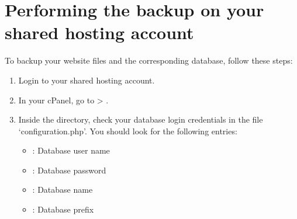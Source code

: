 \documentclass[letterpaper,10pt,english]{sphinxmanual}
\begin{document}
\section{Performing the backup on your shared hosting account}
\label{\detokenize{joomla-to-vps:performing-the-backup-on-your-shared-hosting-account}}\label{\detokenize{joomla-to-vps:credentials}}
\sphinxAtStartPar
To backup your website files and the corresponding database, follow these steps:
\begin{enumerate}
%
\item {} 
\sphinxAtStartPar
Login to your shared hosting account.

\item {} 
\sphinxAtStartPar
In your cPanel, go to  > .
\begin{quote}

\begin{figure}[htbp]
\centering

\noindent{}
\end{figure}
\end{quote}

\item {} 
\sphinxAtStartPar
Inside the  directory, check your database login credentials in the file ‘configuration.php’. You should look for the following entries:
\begin{itemize}
\item {} 
\sphinxAtStartPar
{}: Database user name

\item {} 
\sphinxAtStartPar
{}: Database password

\item {} 
\sphinxAtStartPar
{}: Database name

\item {} 
\sphinxAtStartPar
{}: Database prefix
\begin{quote}

\begin{figure}[htbp]
\centering

\noindent{}
\end{figure}
\end{quote}


\end{itemize}
\end{enumerate}
\end{document}
